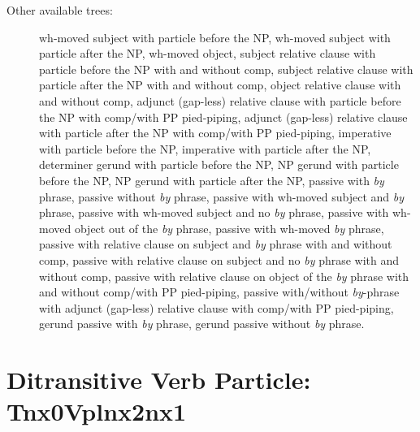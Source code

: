 \begin{description}
\item[Other available trees:] wh-moved subject with particle before the NP, 
wh-moved subject with particle after the NP, wh-moved object, subject 
relative clause with particle before the NP with and without comp, subject relative clause with 
particle after the NP with and without comp, object relative clause with and without comp, 
adjunct (gap-less) relative clause with particle before the NP with comp/with PP pied-piping, 
adjunct (gap-less) relative clause with particle after the NP with comp/with PP pied-piping, 
imperative with particle before the NP, imperative with particle after the NP, determiner gerund 
with particle before the NP, NP gerund with particle before the NP, NP 
gerund with particle after the NP, passive with {\it by} phrase, passive 
without {\it by} phrase, passive with wh-moved subject and {\it by} phrase, 
passive with wh-moved subject and no {\it by} phrase, passive with wh-moved 
object out of the {\it by} phrase, passive with wh-moved {\it by} phrase, 
passive with relative clause on subject and {\it by} phrase with and without comp, passive with 
relative clause on subject and no {\it by} phrase with and without comp, passive with relative 
clause on object of the {\it by} phrase with and without comp/with PP pied-piping, 
passive with/without {\it by}-phrase with adjunct (gap-less) relative clause 
with comp/with PP pied-piping, gerund passive with {\it by} 
phrase, gerund passive without {\it by} phrase. 
 
\end{description} 
 
 
 
 
\section{Ditransitive Verb Particle: Tnx0Vplnx2nx1} 
\label{nx0Vplnx1nx2} 
 
